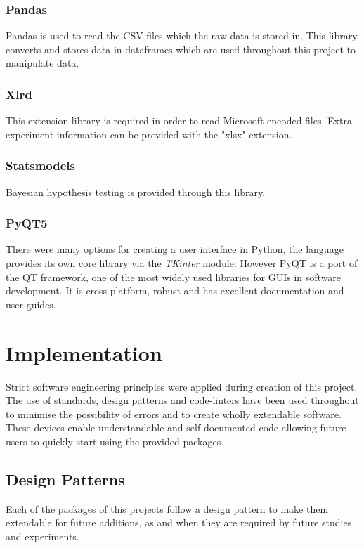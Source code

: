 \documentclass[11pt]{report}
\begin{document}
\subsubsection{Pandas}
\label{sec:orgb3a541c}
Pandas is used to read the CSV files which the raw data is stored in. This library converts and stores data in dataframes which are used throughout this project to manipulate data.
\subsubsection{Xlrd}
\label{sec:orgc26186d}
This extension library is required in order to read Microsoft encoded files. Extra experiment information can be provided with the "xlsx" extension.
\subsubsection{Statsmodels}
\label{sec:org0fc0d8a}
Bayesian hypothesis testing is provided through this library.
\subsubsection{PyQT5}
\label{sec:orgcfd2c5f}
There were many options for creating a user interface in Python, the language provides its own core library via the \emph{TKinter} module. However PyQT is a port of the QT framework, one of the most widely used libraries for GUIs in software development. It is cross platform, robust and has excellent documentation and user-guides.

\section{Implementation}
\label{sec:org1078b59}
Strict software engineering principles were applied during creation of this project. The use of standards, design patterns and code-linters have been used throughout to minimise the possibility of errors and to create wholly extendable software. These devices enable understandable and self-documented code allowing future users to quickly start using the provided packages.

\subsection{Design Patterns}
\label{sec:orgfcd65d6}
Each of the packages of this projects follow a design pattern to make them extendable for future additions, as and when they are required by future studies and experiments.
\end{document}
